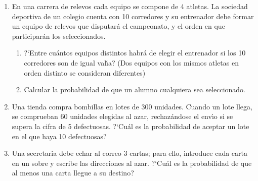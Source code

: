 \documentclass[11pt]{book}
\begin{document}
\begin{enumerate}
\item  En una carrera de relevos cada equipo  se  compone  de  4  atletas.  La
    sociedad deportiva  de  un  colegio  cuenta  con  10  corredores  y  su
    entrenador debe formar un equipo de relevos que disputar{\'a} el campeonato,
    y el orden en que participar{\'a}n los seleccionados.
    \begin{enumerate}
      \item ?`Entre cu{\'a}ntos equipos distintos habr{\'a} de elegir el entrenador si los
       10 corredores son de igual val{\'\i}a? (Dos equipos  con los mismos atletas en
       orden distinto se consideran diferentes)
      \item Calcular  la  probabilidad  de  que   un   alumno   cualquiera   sea
       seleccionado.
    \end{enumerate}

\item Una tienda compra bombillas en lotes de 300 unidades. Cuando  un  lote  llega,  se
    comprueban 60 unidades elegidas al azar, rechaz{\'a}ndose el  env{\'\i}o  si  se
    supera la cifra de 5 defectuosas. ?`Cu{\'a}l es la probabilidad  de  aceptar
    un lote en el que haya 10 defectuosas?

\item Una secretaria debe echar al correo $3$ cartas; para ello, introduce cada carta en
      un sobre y escribe las direcciones al azar. ?`Cu{\'a}l es la probabilidad de que al
      menos una carta llegue a su destino?
\end{enumerate}
\end{document}
